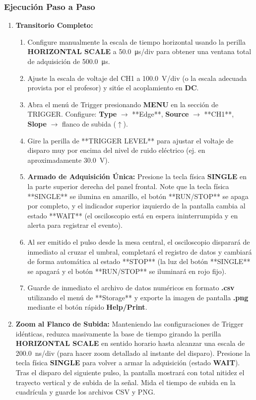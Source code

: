 \documentclass[12pt, letterpaper]{article}
\begin{document}
\subsubsection*{Ejecución Paso a Paso}
\begin{enumerate}
    \item \textbf{Transitorio Completo:} 
    \begin{enumerate}[label=\roman*.]
        \item Configure manualmente la escala de tiempo horizontal usando la perilla \textbf{HORIZONTAL SCALE} a \SI{50.0}{\micro\second/div} para obtener una ventana total de adquisición de \SI{500.0}{\micro\second}.
        \item Ajuste la escala de voltaje del CH1 a \SI{100.0}{V/div} (o la escala adecuada provista por el profesor) y sitúe el acoplamiento en \textbf{DC}.
        \item Abra el menú de Trigger presionando \textbf{MENU} en la sección de TRIGGER. Configure: \textbf{Type} $\rightarrow$ **Edge**, \textbf{Source} $\rightarrow$ **CH1**, \textbf{Slope} $\rightarrow$ flanco de subida ($\uparrow$).
        \item Gire la perilla de **TRIGGER LEVEL** para ajustar el voltaje de disparo muy por encima del nivel de ruido eléctrico (ej. en aproximadamente \SI{+30.0}{\volt}).
        \item \textbf{Armado de Adquisición Única:} Presione la tecla física \textbf{SINGLE} en la parte superior derecha del panel frontal. Note que la tecla física **SINGLE** se ilumina en amarillo, el botón **RUN/STOP** se apaga por completo, y el indicador superior izquierdo de la pantalla cambia al estado **WAIT** (el osciloscopio está en espera ininterrumpida y en alerta para registrar el evento).
        \item Al ser emitido el pulso desde la mesa central, el osciloscopio disparará de inmediato al cruzar el umbral, completará el registro de datos y cambiará de forma automática al estado **STOP** (la luz del botón **SINGLE** se apagará y el botón **RUN/STOP** se iluminará en rojo fijo).
        \item Guarde de inmediato el archivo de datos numéricos en formato \textbf{.csv} utilizando el menú de **Storage** y exporte la imagen de pantalla \textbf{.png} mediante el botón rápido \textbf{Help/Print}.
    \end{enumerate}
    
    \item \textbf{Zoom al Flanco de Subida:} Manteniendo las configuraciones de Trigger idénticas, reduzca masivamente la base de tiempo girando la perilla \textbf{HORIZONTAL SCALE} en sentido horario hasta alcanzar una escala de \SI{200.0}{ns/div} (para hacer zoom detallado al instante del disparo). Presione la tecla física \textbf{SINGLE} para volver a armar la adquisición (estado \textbf{WAIT}). Tras el disparo del siguiente pulso, la pantalla mostrará con total nitidez el trayecto vertical y de subida de la señal. Mida el tiempo de subida en la cuadrícula y guarde los archivos CSV y PNG.
    

\end{enumerate}
\end{document}
